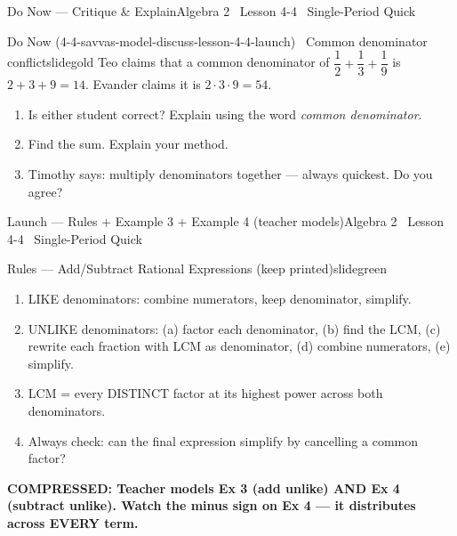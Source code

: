 \documentclass[aspectratio=169, 11pt]{beamer}
\begin{document}

\begin{frame}{Do Now --- Critique \& Explain}{Algebra 2 \textperiodcentered\ Lesson 4-4 \textperiodcentered\ Single-Period Quick}
\vspace{0.2cm}
\begin{projcard}{Do Now (4-4-savvas-model-discuss-lesson-4-4-launch) \textperiodcentered\ Common denominator conflict}{slidegold}
Teo claims that a common denominator of
\(\dfrac{1}{2} + \dfrac{1}{3} + \dfrac{1}{9}\)
is \(2+3+9=14\). Evander claims it is \(2\cdot3\cdot9=54\).

\vspace{0.2cm}
\begin{enumerate}
  \setlength{\itemsep}{2pt}
  \item[\textbf{A.}] Is either student correct? Explain using the word \textit{common denominator}.
  \item[\textbf{B.}] Find the sum. Explain your method.
  \item[\textbf{C.}] Timothy says: multiply denominators together --- always quickest. Do you agree?
\end{enumerate}
\end{projcard}
\end{frame}

\begin{frame}{Launch --- Rules + Example 3 + Example 4 (teacher models)}{Algebra 2 \textperiodcentered\ Lesson 4-4 \textperiodcentered\ Single-Period Quick}
\vspace{0.15cm}
\begin{projcard}{Rules --- Add/Subtract Rational Expressions (keep printed)}{slidegreen}
\small
\begin{enumerate}
  \setlength{\itemsep}{0pt}
  \item LIKE denominators: combine numerators, keep denominator, simplify.
  \item UNLIKE denominators: (a) factor each denominator, (b) find the LCM,
        (c) rewrite each fraction with LCM as denominator, (d) combine numerators, (e) simplify.
  \item LCM = every DISTINCT factor at its highest power across both denominators.
  \item Always check: can the final expression simplify by cancelling a common factor?
\end{enumerate}

\vspace{0.1cm}
\textcolor{slideaccent}{\textbf{COMPRESSED: Teacher models Ex 3 (add unlike) AND Ex 4 (subtract unlike). Watch the minus sign on Ex 4 --- it distributes across EVERY term.}}
\end{projcard}
\end{frame}
\end{document}

